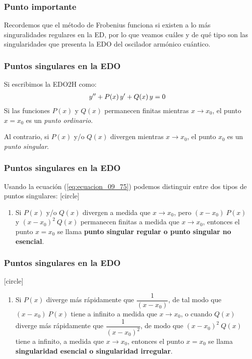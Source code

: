 \documentclass[12pt]{beamer}
\begin{document}
\begin{frame}
\frametitle{Punto importante}
Recordemos que el método de Frobenius funciona si existen a lo más singuralidades regulares en la ED, por lo que veamos cuáles y de qué tipo son las singularidades que presenta la EDO del oscilador armónico cuántico. 
\end{frame}
\begin{frame}
\frametitle{Puntos singulares en la EDO}
Si escribimos la EDO2H como:
\pause
\begin{align}
{y}^{\prime \prime} + P(x) \, {y}^{\prime} + Q(x) \, y = 0
\label{eq:ecuacion_09_75}
\end{align}
\pause
Si las funciones $P(x)$ y $Q(x)$ permanecen finitas mientras $x \to x_{0}$, el punto $x = x_{0}$ es un \emph{punto ordinario}.
\par
\pause
Al contrario, si $P(x)$ y/o $Q(x)$ divergen mientras $x \to x_{0}$, el punto $x_{0}$ es un \emph{punto singular}.
\end{frame}
\begin{frame}
\frametitle{Puntos singulares en la EDO}
Usando la ecuación (\ref{eq:ecuacion_09_75}) podemos distinguir entre dos tipos de puntos singulares:
\pause
{}
[circle]
\begin{enumerate}[<+->]
\item Si $P(x)$ y/o $Q(x)$ divergen a medida que $x \to x_{0}$, pero $(x - x_{0}) \: P(x)$ y $(x - x_{0})^{2} \: Q(x)$ permanecen finitas a medida que $x \to x_{0}$, entonces el punto $x = x_{0}$ se llama \textbf{punto singular regular o punto singular no esencial}.
\seti
\end{enumerate}
\end{frame}
\begin{frame}
\frametitle{Puntos singulares en la EDO}
[circle]
\begin{enumerate}[<+->]
\conti
\item Si $P(x)$ diverge más rápidamente que $\dfrac{1}{(x - x_{0})}$, de tal modo que $(x - x_{0}) \: P(x)$ tiene a infinito a medida que $x \to x_{0}$, o cuando $Q(x)$ diverge más rápidamente que $\dfrac{1}{(x - x_{0})^{2}}$, de modo que $(x - x_{0})^{2} \: Q(x)$ tiene a infinito, a medida que $x \to x_{0}$, entonces el punto $x = x_{0}$ se llama \textbf{singularidad esencial o singularidad irregular}.
\end{enumerate}
\end{frame}
\end{document}
